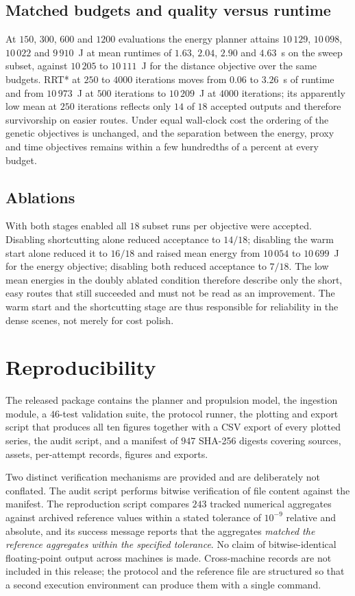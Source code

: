 \documentclass[conference]{IEEEtran}
\begin{document}
\subsection{Matched budgets and quality versus runtime}
At $150$, $300$, $600$ and $1200$ evaluations the energy planner attains
$10\,129$, $10\,098$, $10\,022$ and $9\,910$~J at mean runtimes of $1.63$,
$2.04$, $2.90$ and $4.63$~s on the sweep subset, against $10\,205$ to
$10\,111$~J for the distance objective over the same budgets. RRT* at $250$ to
$4000$ iterations moves from $0.06$ to $3.26$~s of runtime and from $10\,973$~J
at $500$ iterations to $10\,209$~J at $4000$ iterations; its apparently low mean
at $250$ iterations reflects only $14$ of $18$ accepted outputs and therefore
survivorship on easier routes. Under equal wall-clock cost the ordering of the
genetic objectives is unchanged, and the separation between the energy, proxy
and time objectives remains within a few hundredths of a percent at every
budget.

\subsection{Ablations}
With both stages enabled all $18$ subset runs per objective were accepted.
Disabling shortcutting alone reduced acceptance to $14/18$; disabling the warm
start alone reduced it to $16/18$ and raised mean energy from $10\,054$ to
$10\,699$~J for the energy objective; disabling both reduced acceptance to
$7/18$. The low mean energies in the doubly ablated condition therefore describe
only the short, easy routes that still succeeded and must not be read as an
improvement. The warm start and the shortcutting stage are thus responsible for
reliability in the dense scenes, not merely for cost polish.

\section{Reproducibility}
The released package contains the planner and propulsion model, the ingestion
module, a $46$-test validation suite, the protocol runner, the plotting and
export script that produces all ten figures together with a CSV export of every
plotted series, the audit script, and a manifest of $947$ SHA-256 digests
covering sources, assets, per-attempt records, figures and exports.

Two distinct verification mechanisms are provided and are deliberately not
conflated. The audit script performs bitwise verification of file content
against the manifest. The reproduction script compares $243$ tracked numerical
aggregates against archived reference values within a stated tolerance of
$10^{-9}$ relative and absolute, and its success message reports that the
aggregates \emph{matched the reference aggregates within the specified
tolerance}. No claim of bitwise-identical floating-point output across machines
is made. Cross-machine records are not included in this release; the protocol
and the reference file are structured so that a second execution environment can
produce them with a single command.
\end{document}
